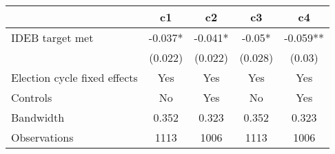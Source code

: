 \begin{tabular}{lcccc}
  \toprule
 & c1 & c2 & c3 & c4 \\ 
  \midrule
IDEB target met & -0.037* & -0.041* & -0.05* & -0.059** \\ 
   & (0.022) & (0.022) & (0.028) & (0.03) \\ 
  Election cycle fixed effects & Yes & Yes & Yes & Yes \\ 
  Controls & No & Yes & No & Yes \\ 
  Bandwidth & 0.352 & 0.323 & 0.352 & 0.323 \\ 
  Observations & 1113 & 1006 & 1113 & 1006 \\ 
   \bottomrule
\end{tabular}
